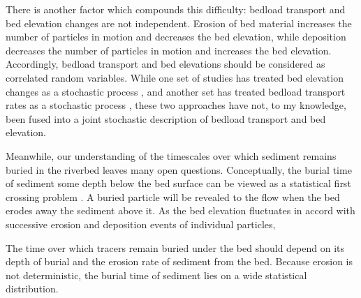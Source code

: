 \documentclass{article}
\begin{document}
There is another factor which compounds this difficulty: bedload transport and bed elevation changes are not independent. 
Erosion of bed material increases the number of particles in motion and decreases the bed elevation, while deposition decreases the number of particles in motion and increases the bed elevation. 
Accordingly, bedload transport and bed elevations should be considered as correlated random variables.
While one set of studies has treated bed elevation changes as a stochastic process \citep{Yang1971, Nakagawa1980, Voepel2013, Martin2014}, and another set has treated bedload transport rates as a stochastic process \citep{Sun2000, Ancey2008, Heyman2013}, these two approaches have not, to my knowledge, been fused into a joint stochastic description of bedload transport and bed elevation. 

Meanwhile, our understanding of the timescales over which sediment remains buried in the riverbed leaves many open questions. Conceptually, the burial time of sediment some depth below the bed surface can be viewed as a statistical first crossing problem \citep{Voepel, Martin2014}. A buried particle will be revealed to the flow when the bed erodes away the sediment above it. As the bed elevation fluctuates in accord with successive erosion and deposition events of individual particles, 


The time over which tracers remain buried under the bed should depend on its depth of burial and the erosion rate of sediment from the bed. Because erosion is not deterministic, the burial time of sediment lies on a wide statistical distribution. 



\end{document}
